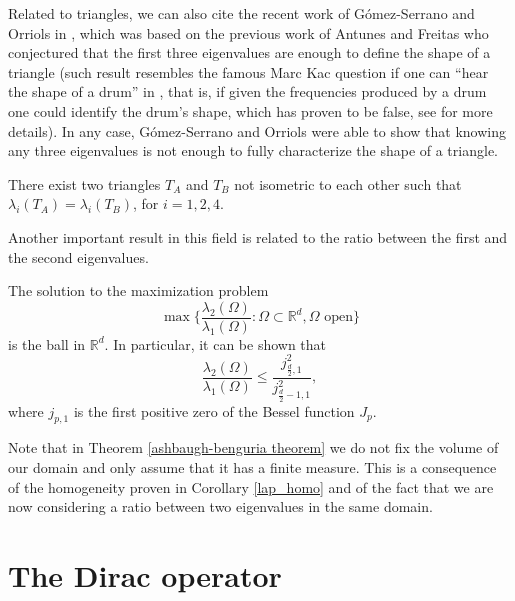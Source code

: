Related to triangles, we can also cite the recent work of Gómez-Serrano and Orriols in \cite{gomez2021any}, which was based on the previous work of Antunes and Freitas \cite{antunes2011inverse} who conjectured that the first three eigenvalues are enough to define the shape of a triangle (such result resembles the famous Marc Kac question if one can ``hear the shape of a drum'' in \cite{kac1966can}, that is, if given the frequencies produced by a drum one could identify the drum's shape, which has proven to be false, see \cite{gordon1992isospectral} for more details). In any case, Gómez-Serrano and Orriols were able to show that knowing any three eigenvalues is not enough to fully characterize the shape of a triangle.
\begin{theorem}
    There exist two triangles \(T_A\) and \(T_B\) not isometric to each other such that \(\lambda_i(T_A) = \lambda_i(T_B)\), for \(i=1, 2, 4\).    
\end{theorem}

Another important result in this field is related to the ratio between the first and the second eigenvalues.
\begin{theorem}\label{ashbaugh-benguria theorem}
    The solution to the maximization problem
    \[
    \max \Big\{\frac{\lambda_2(\Omega)}{\lambda_1(\Omega)}: \Omega \subset \mathbb{R}^d, \Omega \text{ open} \Big\}
    \]
    is the ball in \(\mathbb{R}^d\). In particular, it can be shown that
    \[
    \frac{\lambda_2(\Omega)}{\lambda_1(\Omega)}  \leq \frac{j_{\frac{d}{2},1}^2}{j_{\frac{d}{2}-1,1}^2},
    \]
    where \(j_{p,1}\) is the first positive zero of the Bessel function \(J_p\).
\end{theorem}

\begin{remark}
    Note that in Theorem \ref{ashbaugh-benguria theorem} we do not fix the volume of our domain and only assume that it has a finite measure. This is a consequence of the homogeneity proven in Corollary \eqref{lap_homo} and of the fact that we are now considering a ratio between two eigenvalues in the same domain.
\end{remark}


\section{The Dirac operator}
 
